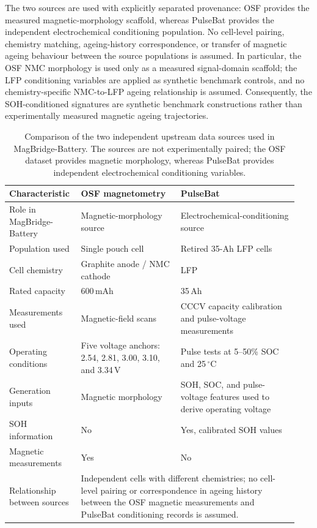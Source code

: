 \documentclass[11pt]{article}
\begin{document}
The two sources are used with explicitly separated provenance: OSF provides the measured magnetic-morphology scaffold, whereas PulseBat provides the independent electrochemical conditioning population. No cell-level pairing, chemistry matching, ageing-history correspondence, or transfer of magnetic
ageing behaviour between the source populations is assumed. In particular, the OSF NMC morphology is used only as a measured signal-domain scaffold; the LFP conditioning variables are applied as synthetic benchmark controls, and no chemistry-specific NMC-to-LFP ageing relationship is assumed.
Consequently, the SOH-conditioned signatures are synthetic benchmark constructions rather than experimentally measured magnetic ageing trajectories.

\begin{table}[!h]
\centering
\caption{Comparison of the two independent upstream data sources used in
MagBridge-Battery. The sources are not experimentally paired; the OSF
dataset provides magnetic morphology, whereas PulseBat provides independent
electrochemical conditioning variables.}
\label{tab:source_comparison}
\small
\renewcommand{\arraystretch}{1.15}
\begin{tabular}{p{0.22\linewidth}p{0.33\linewidth}p{0.39\linewidth}}
\hline
\textbf{Characteristic} &
\textbf{OSF magnetometry} &
\textbf{PulseBat} \\
\hline

Role in MagBridge-Battery &
Magnetic-morphology source &
Electrochemical-conditioning source \\

Population used &
Single pouch cell &
Retired 35-Ah LFP cells \\

Cell chemistry &
Graphite anode / NMC cathode &
LFP \\

Rated capacity &
600\,mAh &
35\,Ah \\

Measurements used &
Magnetic-field scans &
CCCV capacity calibration and pulse-voltage measurements \\

Operating conditions &
Five voltage anchors:
2.54, 2.81, 3.00, 3.10, and 3.34\,V &
Pulse tests at 5--50\% SOC and 25\,$^\circ$C \\

Generation inputs &
Magnetic morphology &
SOH, SOC, and pulse-voltage features used to derive operating voltage \\

SOH information &
No &
Yes, calibrated SOH values \\

Magnetic measurements &
Yes &
No \\

Relationship between sources &
\multicolumn{2}{p{0.70\linewidth}}{
Independent cells with different chemistries; no cell-level pairing or correspondence in ageing history between the OSF magnetic measurements and PulseBat conditioning records is assumed.} \\
\hline
\end{tabular}
\end{table}
\end{document}

